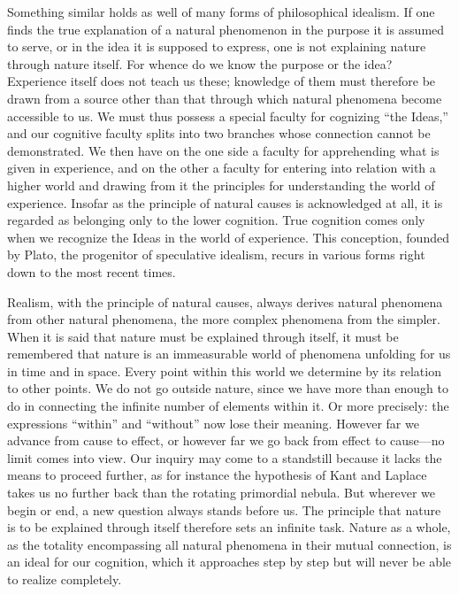 \documentclass[12pt,a4paper]{article}
\begin{document}
Something similar holds as well of many forms of philosophical idealism.
If one finds the true explanation of a natural phenomenon in the purpose
it is assumed to serve, or in the idea it is supposed to express, one is
not explaining nature through nature itself. For whence do we know the
purpose or the idea? Experience itself does not teach us these; knowledge
of them must therefore be drawn from a source other than that through
which natural phenomena become accessible to us. We must thus possess a
special faculty for cognizing ``the Ideas,'' and our cognitive faculty
splits into two branches whose connection cannot be demonstrated. We then
have on the one side a faculty for apprehending what is given in
experience, and on the other a faculty for entering into relation with a
higher world and drawing from it the principles for understanding the
world of experience. Insofar as the principle of natural causes is
acknowledged at all, it is regarded as belonging only to the lower
cognition. True cognition comes only when we recognize the Ideas in the
world of experience. This conception, founded by Plato, the progenitor of
speculative idealism, recurs in various forms right down to the most
recent times.

Realism, with the principle of natural causes, always derives natural
phenomena from other natural phenomena, the more complex phenomena from
the simpler. When it is said that nature must be explained through itself,
it must be remembered that nature is an immeasurable world of phenomena
unfolding for us in time and in space. Every point within this world we
determine by its relation to other points. We do not go outside nature,
since we have more than enough to do in connecting the infinite number of
elements within it. Or more precisely: the expressions ``within'' and
``without'' now lose their meaning. However far we advance from cause to
effect, or however far we go back from effect to cause---no limit comes
into view. Our inquiry may come to a standstill because it lacks the
means to proceed further, as for instance the hypothesis of Kant and
Laplace takes us no further back than the rotating primordial nebula. But
wherever we begin or end, a new question always stands before us. The
principle that nature is to be explained through itself therefore sets an
infinite task. Nature as a whole, as the totality encompassing all natural
phenomena in their mutual connection, is an ideal for our cognition, which
it approaches step by step but will never be able to realize completely.
\end{document}
